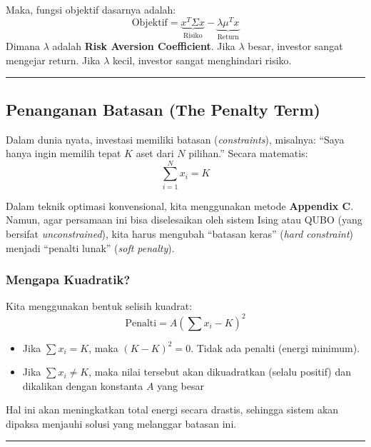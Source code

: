 Maka, fungsi objektif dasarnya adalah: \[ \text{Objektif} = \underbrace{x^T \Sigma x}_{\text{Risiko}} - \underbrace{\lambda \mu^T x}_{\text{Return}} \] Dimana \(\lambda\) adalah \textbf{Risk Aversion Coefficient}. Jika \(\lambda\) besar, investor sangat mengejar return. Jika \(\lambda\) kecil, investor sangat menghindari risiko.

\begin{center}\rule{0.5\linewidth}{0.5pt}\end{center}

\hypertarget{penanganan-batasan-the-penalty-term}{%
\subsection{Penanganan Batasan (The Penalty Term)}\label{penanganan-batasan-the-penalty-term}}

Dalam dunia nyata, investasi memiliki batasan (\emph{constraints}), misalnya: ``Saya hanya ingin memilih tepat \(K\) aset dari \(N\) pilihan.'' Secara matematis: \[ \sum_{i=1}^N x_i = K \]

Dalam teknik optimasi konvensional, kita menggunakan metode \textbf{Appendix C}. Namun, agar persamaan ini bisa diselesaikan oleh sistem Ising atau QUBO (yang bersifat \emph{unconstrained}), kita harus mengubah ``batasan keras'' (\emph{hard constraint}) menjadi ``penalti lunak'' (\emph{soft penalty}).

\hypertarget{mengapa-kuadratik}{%
\subsubsection{Mengapa Kuadratik?}\label{mengapa-kuadratik}}

Kita menggunakan bentuk selisih kuadrat: \[ \text{Penalti} = A \left( \sum x_i - K \right)^2 \] 
\begin{itemize}
    \item Jika \(\sum x_i = K\), maka \((K-K)^2 = 0\). Tidak ada penalti (energi minimum).
    \item Jika \(\sum x_i \neq K\), maka nilai tersebut akan dikuadratkan (selalu positif) dan dikalikan dengan konstanta \(A\) yang besar
\end{itemize} 
Hal ini akan meningkatkan total energi secara drastis, sehingga sistem akan dipaksa menjauhi solusi yang melanggar batasan ini.

\begin{center}\rule{0.5\linewidth}{0.5pt}\end{center}

